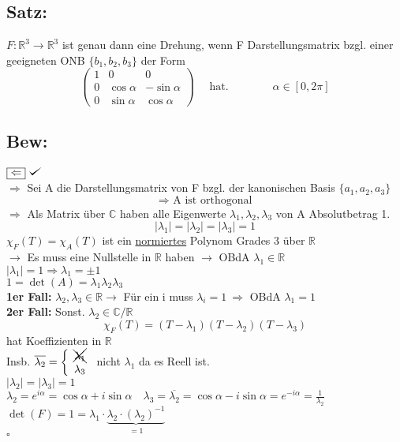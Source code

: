 \documentclass[titlepage,12pt,a4paper,ngerman]{report}
\newenvironment{bew}[1]{\subsection{Bew: #1}}{\hfill$\square$}
\def\checkmark{\tikz\fill[scale=0.4](0,.35) -- (.25,0) -- (1,.7) -- (.25,.15) -- cycle;}
\newcommand{\Bew}[2]{\begin{bew}{#1}#2\end{bew}}
\newcommand{\tx}[1]{\textrm{#1}}
\newcommand{\ub}[1]{\underbrace{#1}}
\begin{document}
\subsection{Satz:}
$ F : \mathbb{R}^3 \to \mathbb{R}^3 $ ist genau dann eine Drehung, wenn F Darstellungsmatrix bzgl. einer geeigneten ONB $ \{b_1,b_2,b_3\} $ der Form
$$\begin{pmatrix}
1 & 0 & 0 \\
0 & \cos \alpha & - \sin \alpha\\
0 & \sin \alpha & \cos \alpha
\end{pmatrix} \quad \tx{ hat.} \qquad \qquad \alpha \in [0,2 \pi]$$ 

\Bew{}{
$ \boxed{\Leftarrow}\  \checkmark $\\
$ \boxed{\Rightarrow} $ Sei A die Darstellungsmatrix von F bzgl. der kanonischen Basis $ \{a_1,a_2,a_3\} $
$$ \Rightarrow \tx{ A ist orthogonal}$$
$ \Rightarrow $ Als Matrix über $ \mathbb{C} $ haben alle Eigenwerte $ \lambda_1,\lambda_2,\lambda_3 $ von A Absolutbetrag 1.
$$|\lambda_1| = |\lambda_2| = |\lambda_3| = 1$$
$ \chi_F(T) = \chi_A(T) $ ist ein \underline{normiertes} Polynom Grades 3 über \underline{\underline{$ \mathbb{R} $}}\\
$ \rightarrow $ Es muss eine Nullstelle in $ \mathbb{R} $ haben $ \rightarrow $ OBdA $ \lambda_1 \in \mathbb{R} $\\[5pt]
$ |\lambda_1| = 1 \Rightarrow \lambda_1 = \pm 1 $\\
$  1 = \det(A) = \lambda_1 \lambda_2 \lambda_3 $\\
\textbf{1er Fall:} $ \lambda_2, \lambda_3 \in \mathbb{R} \rightarrow $ Für ein i muss $\lambda_i = 1 \ \Rightarrow $ OBdA $ \lambda_1 = 1 $\\
\textbf{2er Fall:} Sonst. $ \lambda_2 \in \mathbb{C/R} $
$$\chi_F(T) = (T-\lambda_1) (T-\lambda_2) (T-\lambda_3)$$
hat Koeffizienten in $ \mathbb{R} $\\[5pt]
Insb. $ \overline{\lambda_2} = \left\{ \begin{array}{cc}
\cancel{\bcancel{\lambda_1}}\\ \lambda_3
\end{array} \right. $
nicht $ \lambda_1 $ da es Reell ist.\\
$ |\lambda_2| = |\lambda_3| = 1 $\\
$ \lambda_2 = e^{i\alpha} = \cos \alpha + i \sin \alpha \quad \lambda_3 = \overline{\lambda_2} = \cos \alpha - i \sin \alpha = e^{-i\alpha} = \frac{1}{\lambda_2} $\\
$ \det(F) = 1 = \lambda_1 \cdot \ub{ \lambda_2 \cdot (\lambda_2)^{-1}}_{= 1} $\\
}
\end{document}
